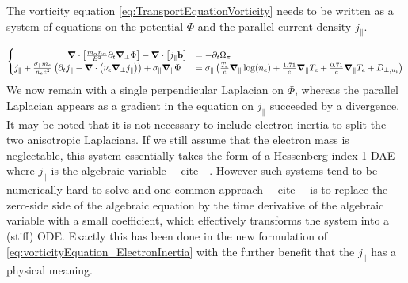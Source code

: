 The vorticity equation \autoref{eq:TransportEquationVorticity} needs to be written as a system of equations on the potential $\Phi$ and the parallel current density $j_\parallel$.

\begin{equation}
	\label{eq:vorticityEquation_ElectronInertia}
	\begin{cases}
		\qquad\qquad\qquad\grad\cdot\left[\frac{m_\alpha n_\alpha}{ B^2}\partial_t\grad_\perp\Phi\right] - \grad\cdot\left[j_\parallel\mathbf{b}\right]&=  - \partial_t \Omega_\pi \\
		j_\parallel + \frac{\sigma_\parallel m_e}{n_ee^2} \left(\partial_t j_\parallel - \grad\cdot\left(\nu_e\grad_\perp j_\parallel\right)\right) + \sigma_\parallel \grad_\parallel\Phi &= \sigma_\parallel \left(\frac{T_e}{e}\grad_\parallel\log(n_e) + \frac{1.71}{e}\grad_\parallel T_e + \frac{0.71}{e}\grad_\parallel T_e + D_{\perp,u_i}\right)
	\end{cases}
\end{equation}
We now remain with a single perpendicular Laplacian on $\Phi$, whereas the parallel Laplacian appears as a gradient in the equation on $j_\parallel$ succeeded by a divergence. It may be noted that it is not necessary to include electron inertia to split the two anisotropic Laplacians. If we still assume that the electron mass is neglectable, this system essentially takes the form of a Hessenberg index-1 DAE where $j_\parallel$ is the algebraic variable ---cite---. However such systems tend to be numerically hard to solve and one common approach ---cite--- is to replace the zero-side side of the algebraic equation by the time derivative of the algebraic variable with a small coefficient, which effectively transforms the system into a (stiff) ODE. Exactly this has been done in the new formulation of \autoref{eq:vorticityEquation_ElectronInertia} with the further benefit that the $j_\parallel$ has a physical meaning.


